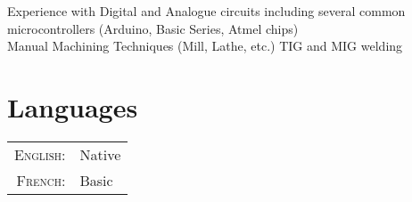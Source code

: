 \documentclass[a4paper,10pt]{article} %
\begin{document}
Experience with Digital and Analogue circuits including several common microcontrollers (Arduino, Basic Series, Atmel chips) \\
Manual Machining Techniques (Mill, Lathe, etc.) TIG and MIG welding\\



\section{Languages}

\begin{tabular}{rl}
\textsc{English:} & Native\\

\textsc{French:} & Basic \\
\end{tabular}

\newpage


\end{document}
